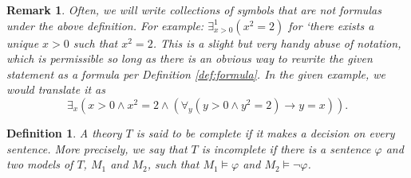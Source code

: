 \documentclass{article}
\newtheorem{remark}[theorem]{Remark}
\newtheorem{definition}[theorem]{Definition}
\theoremstyle{nonumberplain}
\begin{document}
\begin{remark}
Often, we will write collections of symbols that are not formulas under the above definition. For example: $\exists^1_{x>0} (x^2 = 2)$ for `there exists a unique $x>0$ such that $x^2 = 2$. This is a slight but very handy abuse of notation, which is permissible so long as there is an obvious way to rewrite the given statement as a formula per Definition \ref{def:formula}. In the given example, we would translate it as 
\begin{equation}
\exists_x (x > 0 \land x^2 = 2 \land (\forall_y (y > 0 \land y^2 = 2) \rightarrow y=x)).
\end{equation}
\end{remark}

\begin{definition}
A theory $T$ is said to be \emph{complete} if it makes a decision on every sentence. More precisely, we say that $T$ is \emph{incomplete} if there is a sentence $\varphi$ and two models of $T$, $M_1$ and $M_2$, such that $M_1 \vDash \varphi$ and $M_2 \vDash \neg\varphi$.
\end{definition}



\end{document}

